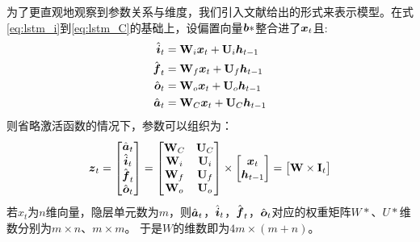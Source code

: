 为了更直观地观察到参数关系与维度，我们引入文献\citep{arunmallyaLSTM}给出的形式来表示模型。在式\ref{eq:lstm_i}到\ref{eq:lstm_C}的基础上，设偏置向量$\boldsymbol{b}*$整合进了$\boldsymbol{x}_t$且:
\begin{align}
\hat{\boldsymbol{i}}_t &= \boldsymbol{\mathbf{W}}_i\boldsymbol{x}_t + \boldsymbol{\mathbf{U}}_i\boldsymbol{h}_{t-1}\\
    \hat{\boldsymbol{f}}_t &= \boldsymbol{\mathbf{W}}_f\boldsymbol{x}_t + \boldsymbol{\mathbf{U}}_f\boldsymbol{h}_{t-1}\\
    \hat{\boldsymbol{o}}_t &= \boldsymbol{\mathbf{W}}_o\boldsymbol{x}_t + \boldsymbol{\mathbf{U}}_o\boldsymbol{h}_{t-1}\\
    \hat{\boldsymbol{a}}_t &= \boldsymbol{\mathbf{W}}_C\boldsymbol{x}_t + \boldsymbol{\mathbf{U}}_C\boldsymbol{h}_{t-1}
\end{align}
则省略激活函数的情况下，参数可以组织为：
\begin{equation}
    \boldsymbol{z}_t =
    \begin{bmatrix}
        \hat{\boldsymbol{a}}_t\\
        \hat{\boldsymbol{i}}_t\\
        \hat{\boldsymbol{f}}_t\\
        \hat{\boldsymbol{o}}_t\\
    \end{bmatrix}
    =
    \begin{bmatrix}
        \boldsymbol{\mathbf{W}}_C & \boldsymbol{\mathbf{U}}_C\\
        \boldsymbol{\mathbf{W}}_i & \boldsymbol{\mathbf{U}}_i\\
        \boldsymbol{\mathbf{W}}_f & \boldsymbol{\mathbf{U}}_f\\
        \boldsymbol{\mathbf{W}}_o & \boldsymbol{\mathbf{U}}_o\\
    \end{bmatrix}
    \times
    \begin{bmatrix}
        \boldsymbol{x}_t\\
        \boldsymbol{h}_{t-1}
    \end{bmatrix}
    =
    \begin{bmatrix}
        \boldsymbol{\mathbf{W}}\times\boldsymbol{\mathbf{I}}_t
    \end{bmatrix}
\end{equation}
若$x_t$为$n$维向量，隐层单元数为$m$，则$\hat{\boldsymbol{a}}_t$，$\hat{\boldsymbol{i}}_t$，$\hat{\boldsymbol{f}}_t$，$\hat{\boldsymbol{o}}_t$对应的权重矩阵$W*$、$U*$维数分别为$m\times n$、$m\times m$。
于是$W$的维数即为$4m\times(m+n)$。

